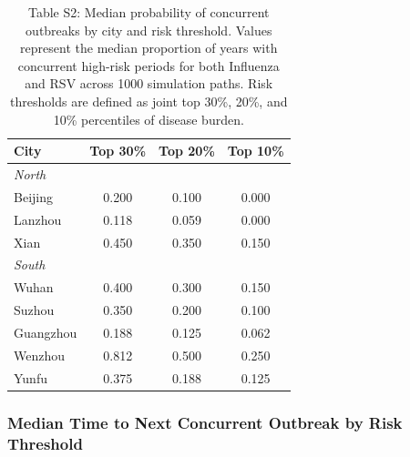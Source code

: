 \begin{table}[htbp]
\centering
\caption{Table S2: Median probability of concurrent outbreaks by city and risk threshold. Values represent the median proportion of years with concurrent high-risk periods for both Influenza and RSV across 1000 simulation paths. Risk thresholds are defined as joint top 30\%, 20\%, and 10\% percentiles of disease burden.}
\label{tab:joint_outbreak_probability}
\begin{tabular}{lccc}
\toprule
\textbf{City} & \textbf{Top 30\%} & \textbf{Top 20\%} & \textbf{Top 10\%} \\
\midrule
\multicolumn{4}{l}{\textit{North}} \\
Beijing & 0.200 & 0.100 & 0.000 \\
Lanzhou & 0.118 & 0.059 & 0.000 \\
Xian & 0.450 & 0.350 & 0.150 \\
\midrule
\multicolumn{4}{l}{\textit{South}} \\
Wuhan & 0.400 & 0.300 & 0.150 \\
Suzhou & 0.350 & 0.200 & 0.100 \\
Guangzhou & 0.188 & 0.125 & 0.062 \\
Wenzhou & 0.812 & 0.500 & 0.250 \\
Yunfu & 0.375 & 0.188 & 0.125 \\
\bottomrule
\end{tabular}
\end{table}

\clearpage

\subsubsection{Median Time to Next Concurrent Outbreak by Risk Threshold}
\label{subsec:survival_median_times}

